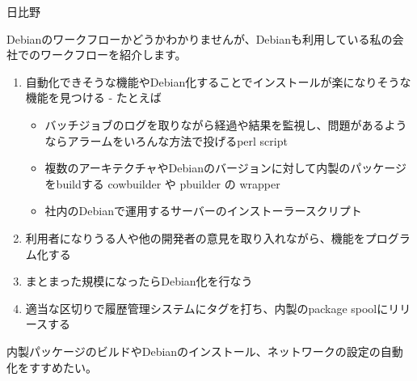 \begin{prework}{日比野}

Debianのワークフローかどうかわかりませんが、Debianも利用している私の会社でのワークフローを紹介します。

 \begin{enumerate}
  \item 自動化できそうな機能やDebian化することでインストールが楽になりそうな機能を見つける - たとえば
  \begin{itemize}
   \item バッチジョブのログを取りながら経過や結果を監視し、問題があるようならアラームをいろんな方法で投げるperl script
   \item 複数のアーキテクチャやDebianのバージョンに対して内製のパッケージをbuildする cowbuilder や pbuilder の wrapper
   \item 社内のDebianで運用するサーバーのインストーラースクリプト
  \end{itemize}
  \item 利用者になりうる人や他の開発者の意見を取り入れながら、機能をプログラム化する
  \item まとまった規模になったらDebian化を行なう
  \item 適当な区切りで履歴管理システムにタグを打ち、内製のpackage spoolにリリースする
 \end{enumerate}


内製パッケージのビルドやDebianのインストール、ネットワークの設定の自動化をすすめたい。

\end{prework}
